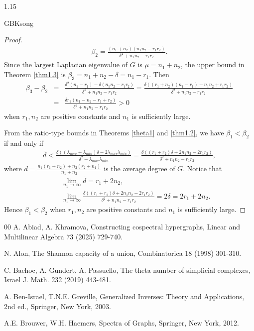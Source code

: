 \documentclass[preprint,12pt]{elsarticle}
\begin{document}
\begin{spacing}{1.15}
\begin{CJK*}{GBK}{song}
\begin{proof}
\begin{eqnarray*}
\beta_2=\frac{(n_1+n_2)(n_1n_2-r_1r_2)}{\delta^2+n_1n_2-r_1r_2}.
\end{eqnarray*}
Since the largest Laplacian eigenvalue of $G$ is $\mu=n_1+n_2$, the upper bound in Theorem \ref{thm1.3} is $\beta_3=n_1+n_2-\delta=n_1-r_1$. Then
\begin{eqnarray*}
\beta_3-\beta_2&=&\frac{\delta^2(n_1-r_1)-\delta(n_1n_2-r_1r_2)}{\delta^2+n_1n_2-r_1r_2}=\frac{\delta((r_1+n_2)(n_1-r_1)-n_1n_2+r_1r_2)}{\delta^2+n_1n_2-r_1r_2}\\
&=&\frac{\delta r_1(n_1-n_2-r_1+r_2)}{\delta^2+n_1n_2-r_1r_2}>0
\end{eqnarray*}
when $r_1,n_2$ are positive constants and $n_1$ is sufficiently large.


From the ratio-type bounds in Theorems \ref{theta1} and \ref{thm1.2}, we have $\beta_1<\beta_2$ if and only if
\begin{eqnarray*}
\overline{d}<\frac{\delta((\lambda_{max}+\lambda_{min})\delta-2\lambda_{max}\lambda_{min})}{\delta^2-\lambda_{max}\lambda_{min}}=\frac{\delta((r_1+r_2)\delta+2n_1n_2-2r_1r_2)}{\delta^2+n_1n_2-r_1r_2},
\end{eqnarray*}
where $\overline{d}=\frac{n_1(r_1+n_2)+n_2(r_2+n_1)}{n_1+n_2}$ is the average degree of $G$. Notice that
\begin{eqnarray*}
&~&\lim_{n_1\rightarrow\infty}\overline{d}=r_1+2n_2,\\
&~&\lim_{n_1\rightarrow\infty}\frac{\delta((r_1+r_2)\delta+2n_1n_2-2r_1r_2)}{\delta^2+n_1n_2-r_1r_2}=2\delta=2r_1+2n_2.
\end{eqnarray*}
Hence $\beta_1<\beta_2$ when $r_1,n_2$ are positive constants and $n_1$ is sufficiently large.
\end{proof}

\begin{thebibliography}{00}
A. Abiad, A. Khramova, Constructing cospectral hypergraphs, Linear and Multilinear Algebra 73 (2025) 729-740.

N. Alon, The Shannon capacity of a union, Combinatorica 18 (1998) 301-310.

C. Bachoc, A. Gundert, A. Passuello, The theta number of simplicial complexes, Israel J. Math. 232 (2019) 443-481.

A. Ben-Israel, T.N.E. Greville, Generalized Inverses: Theory and Applications, 2nd ed., Springer, New York, 2003.

A.E. Brouwer, W.H. Haemers, Spectra of Graphs, Springer, New York, 2012.


\end{thebibliography}
\end{CJK*}
\end{spacing}
\end{document}
